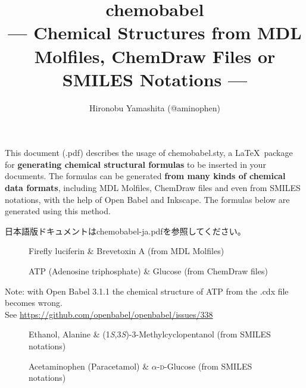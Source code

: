 \documentclass[12pt]{ltjsarticle}
\title{\textsf{chemobabel} \\[1ex]
  \normalsize --- Chemical Structures from MDL Molfiles,
  ChemDraw Files or SMILES Notations --- \\
  }
\author{Hironobu Yamashita (@aminophen)}
\begin{document}
\renewcommand{\figurename}{Fig.\,}
\maketitle

This document (\jobname.pdf) describes the usage of \textsf{chemobabel.sty},
a \LaTeX\ package for \textbf{generating chemical structural formulas}
to be inserted in your documents.
The formulas can be generated \textbf{from many kinds of chemical data
formats}, including MDL Molfiles, ChemDraw files and even from
SMILES notations, with the help of Open Babel and Inkscape.
The formulas below are generated using this method.

日本語版ドキュメントはchemobabel-ja.pdfを参照してください。

\begin{figure}[ht]
  \centering
   \quad
  \caption{Firefly luciferin \& Brevetoxin A (from MDL Molfiles)}
\end{figure}

\begin{figure}[ht]
  \centering
   \hspace{1cm}
  \caption{ATP (Adenosine triphosphate) \& Glucose (from ChemDraw files)}
\end{figure}
\begin{center}\small
Note: with Open Babel 3.1.1 the chemical structure of ATP from the .cdx file
becomes wrong.\\ See \url{https://github.com/openbabel/openbabel/issues/338}
\end{center}

\begin{figure}[ht]
  \centering
   \hspace{1cm}
   \hspace{1cm}
  \caption{Ethanol, Alanine \& (1\textit{S},3\textit{S})-3-Methylcyclopentanol (from SMILES notations)}
\end{figure}

\begin{figure}[ht]
  \centering
   \hspace{1cm}
  \caption{Acetaminophen (Paracetamol) \& $\alpha$-\textsc{d}-Glucose (from SMILES notations)}
\end{figure}
\end{document}
